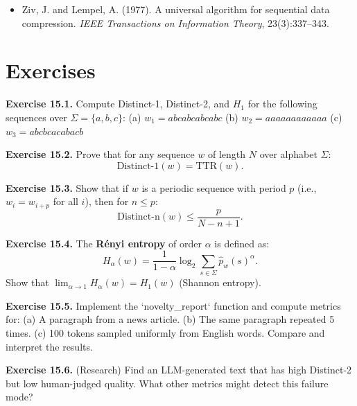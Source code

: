 \begin{itemize}
\item Ziv, J. and Lempel, A. (1977). A universal algorithm for sequential data compression. \textit{IEEE Transactions on Information Theory}, 23(3):337--343.
\end{itemize}



\section{Exercises}

\textbf{Exercise 15.1.} Compute Distinct-1, Distinct-2, and $H_1$ for the following sequences over $\Sigma = \{a, b, c\}$:
(a) $w_1 = abcabcabcabc$
(b) $w_2 = aaaaaaaaaaaa$
(c) $w_3 = abcbcacabacb$

\textbf{Exercise 15.2.} Prove that for any sequence $w$ of length $N$ over alphabet $\Sigma$:
\[\mathrm{Distinct\text{-}1}(w) = \mathrm{TTR}(w).\]

\textbf{Exercise 15.3.} Show that if $w$ is a periodic sequence with period $p$ (i.e., $w_i = w_{i+p}$ for all $i$), then for $n \leq p$:
\[\mathrm{Distinct\text{-}n}(w) \leq \frac{p}{N - n + 1}.\]

\textbf{Exercise 15.4.} The \textbf{Rényi entropy} of order $\alpha$ is defined as:
\[H_\alpha(w) = \frac{1}{1-\alpha} \log_2 \sum_{s \in \Sigma} \hat{p}_w(s)^\alpha.\]
Show that $\lim_{\alpha \to 1} H_\alpha(w) = H_1(w)$ (Shannon entropy).

\textbf{Exercise 15.5.} Implement the `novelty_report` function and compute metrics for:
(a) A paragraph from a news article.
(b) The same paragraph repeated 5 times.
(c) 100 tokens sampled uniformly from English words.
Compare and interpret the results.

\textbf{Exercise 15.6.} (Research) Find an LLM-generated text that has high Distinct-2 but low human-judged quality. What other metrics might detect this failure mode?
